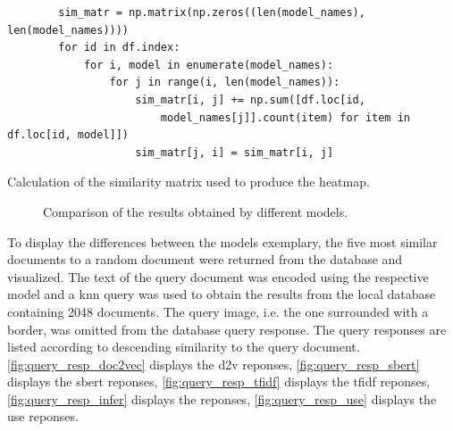 \begin{listing}[htp]
    \begin{verbatim}
        sim_matr = np.matrix(np.zeros((len(model_names), len(model_names))))
        for id in df.index:
            for i, model in enumerate(model_names):
                for j in range(i, len(model_names)):
                    sim_matr[i, j] += np.sum([df.loc[id, 
                        model_names[j]].count(item) for item in df.loc[id, model]])
                    sim_matr[j, i] = sim_matr[i, j]
    \end{verbatim}
    \caption{Calculation of the similarity matrix used to produce the heatmap.
    }
    \label{lst:sim-matrix}
\end{listing}

\begin{figure}%
    \centering
    \qquad
    \caption[Comparison of models]{Comparison of the results obtained by different models.}%
    \label{fig:comparison-models}%
\end{figure}


To display the differences between the models exemplary, the five most similar documents to a random document were returned from the database and visualized.
The text of the query document was encoded using the respective model and a 
\ac{knn} query was used to obtain the results from the local database containing 2048 documents.
The query image, i.e. the one surrounded with a border, was omitted from the database query response.
The query responses are listed according to descending similarity to the query document.
\autoref{fig:query_resp_doc2vec} displays the \ac{d2v} reponses,  
\autoref{fig:query_resp_sbert} displays the \ac{sbert} reponses,  
\autoref{fig:query_resp_tfidf} displays the \ac{tfidf} reponses,  
\autoref{fig:query_resp_infer} displays the \infersent{} reponses,  
\autoref{fig:query_resp_use} displays the \ac{use} reponses.

